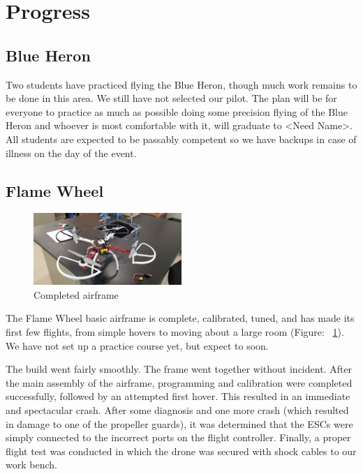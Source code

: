 \section{Progress}

\subsection{Blue Heron}

Two students have practiced flying the Blue Heron, though much work remains to be done in this area. We still have not selected our pilot. The plan will be for everyone to practice as much as possible doing some precision flying of the Blue Heron and whoever is most comfortable with it, will graduate to <Need Name>. All students are expected to be passably competent so we have backups in case of illness on the day of the event.

\subsection{Flame Wheel}

\begin{figure}[!htbp]
\centering 
        \includegraphics[width=0.5\textwidth]{figs/flamewheel1.jpg}
\caption[Completed airframe]{Completed airframe}
\label{fig:airframe} 
\end{figure}

The Flame Wheel basic airframe is complete, calibrated, tuned, and has made its first few flights, from simple hovers to moving about a large room (Figure: ~\ref{fig:airframe}). We have not set up a practice course yet, but expect to soon.

The build went fairly smoothly. The frame went together without incident. After the main assembly of the airframe, programming and calibration were completed successfully, followed by an attempted first hover. This resulted in an immediate and spectacular crash. After some diagnosis and one more crash (which resulted in damage to one of the propeller guards), it was determined that the ESCs were simply connected to the incorrect ports on the flight controller. Finally, a proper flight test was conducted in which the drone was secured with shock cables to our work bench.

